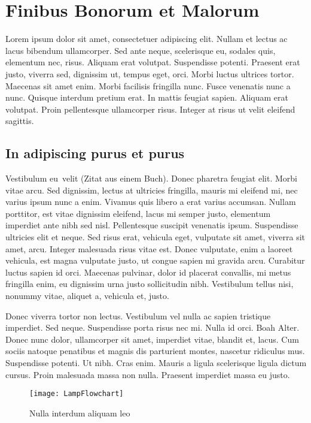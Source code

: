 \chapter{Finibus Bonorum et Malorum}

Lorem ipsum dolor sit amet, consectetuer adipiscing elit. Nullam et lectus ac lacus bibendum ullamcorper. Sed ante neque, scelerisque eu, sodales quis, elementum nec, risus. Aliquam erat volutpat. Suspendisse potenti. Praesent erat justo, viverra sed, dignissim ut, tempus eget, orci. Morbi luctus ultrices tortor. Maecenas sit amet enim. Morbi facilisis fringilla nunc. Fusce venenatis nunc a nunc. Quisque interdum pretium erat. In mattis feugiat sapien. Aliquam erat volutpat. Proin pellentesque ullamcorper risus. Integer at risus ut velit eleifend sagittis.

\section{In adipiscing purus et purus}

\glqq Vestibulum eu\grqq\ velit \cite{praxisbuch2017} (Zitat aus einem Buch). Donec pharetra feugiat elit. Morbi vitae arcu. Sed dignissim, lectus at ultricies fringilla, mauris mi eleifend mi, nec varius ipsum nunc a enim. Vivamus quis libero a erat varius accumsan. Nullam porttitor, est vitae dignissim eleifend, lacus mi semper justo, elementum imperdiet ante nibh sed nisl. Pellentesque suscipit venenatis ipsum. Suspendisse ultricies elit et neque. Sed risus erat, vehicula eget, vulputate sit amet, viverra sit amet, arcu. Integer malesuada risus vitae est. Donec vulputate, enim a laoreet vehicula, est magna vulputate justo, ut congue sapien mi gravida arcu. Curabitur luctus sapien id orci. Maecenas pulvinar, dolor id placerat convallis, mi metus fringilla enim, eu dignissim urna justo sollicitudin nibh. Vestibulum tellus nisi, nonummy vitae, aliquet a, vehicula et, justo.

Donec viverra tortor non lectus. Vestibulum vel nulla ac sapien tristique imperdiet. Sed neque. Suspendisse porta risus nec mi. Nulla id orci. Boah Alter. Donec nunc dolor, ullamcorper sit amet, imperdiet vitae, blandit et, lacus. Cum sociis natoque penatibus et magnis dis parturient montes, nascetur ridiculus mus. Suspendisse potenti. Ut nibh. Cras enim. Mauris a ligula scelerisque ligula dictum cursus. Proin malesuada massa non nulla. Praesent imperdiet massa eu justo.

\begin{figure}[htb]
  \centering
  \texttt{[image: LampFlowchart]}\\ %
  \caption{Nulla interdum aliquam leo}\label{fig:LampFlowchart}
\end{figure}


